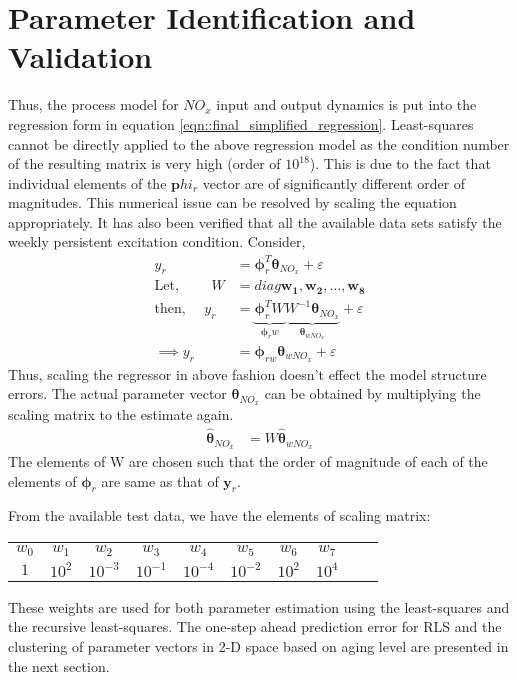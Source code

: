 \newpage
\section{Parameter Identification and Validation}

Thus, the process model for $NO_x$ input and output dynamics is put into the regression form in equation
\ref{eqn::final_simplified_regression}. Least-squares cannot be directly applied to the above regression model as the
condition number of the resulting matrix is very high (order of $10^{18}$). This is due to the fact that individual
elements of the $\pmb phi_r$ vector are of significantly different order of magnitudes. This numerical issue can be
resolved by scaling the equation appropriately. It has also been verified that all the available data sets satisfy the weekly persistent excitation condition. Consider,
\begin{align*}
        y_r &= \pmb \phi_r^T \pmb \theta_{NO_x} + \varepsilon\\
        \text{Let, } \qquad W &= diag \bm{w_1, w_2, \hdots, w_8}\\
        \text{then, } \quad y_r &= \underbrace{\pmb \phi_r^T  W}_{\pmb \phi_rw}
                        \underbrace{ W^{-1} \pmb \theta_{NO_x}}_{\pmb \theta_{wNO_x}} + \varepsilon\\
        \implies y_r &= \pmb \phi_{rw} \pmb \theta_{w NO_x} + \varepsilon
\end{align*}
Thus, scaling the regressor in above fashion doesn't effect the model structure errors. The actual parameter vector $\pmb \theta_{NO_x}$ can be obtained by multiplying the scaling matrix to the estimate again.
\begin{align*}
        \hat{\pmb \theta}_{NO_x} &= W \hat{\pmb \theta}_{wNO_x}
\end{align*}
The elements of W are chosen such that the order of magnitude of each of the elements of $\pmb \phi_r$ are same as that of $\pmb y_r$.

From the available test data, we have the elements of scaling matrix:
\begin{table}[H]
        \centering
        \begin{tabular}{c c c c c c c c c c}
                $w_0$ & $w_1$  & $w_2$     & $w_3$     & $w_4$     & $w_5$     & $w_6$  & $w_7$ \\
                $1$   & $10^2$ & $10^{-3}$ & $10^{-1}$ & $10^{-4}$ & $10^{-2}$ & $10^2$ & $10^{4}$
        \end{tabular}
\end{table}

These weights are used for both parameter estimation using the least-squares and the recursive least-squares. The one-step ahead prediction error for RLS and the clustering of parameter vectors in 2-D space based on aging level are presented in the next section.


